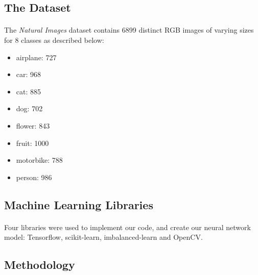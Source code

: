 \documentclass{article}
\begin{document}
\subsection{The Dataset}
\paragraph{}
The {\em Natural Images} dataset contains 6899 distinct RGB images of varying sizes for 8 classes as described below:
\begin{multicols}{2}

\begin{itemize}
	\item airplane: 727 
	\item car: 968
	\item cat: 885
	\item dog: 702
	\item flower: 843
	\item fruit: 1000
	\item motorbike: 788
	\item person: 986
\end{itemize} 

\end{multicols}
\subsection{Machine Learning Libraries}
\paragraph{}
Four libraries were used to implement our code, and create our neural network model: Tensorflow, scikit-learn, imbalanced-learn and OpenCV.

\subsection{Methodology}
\end{document}
